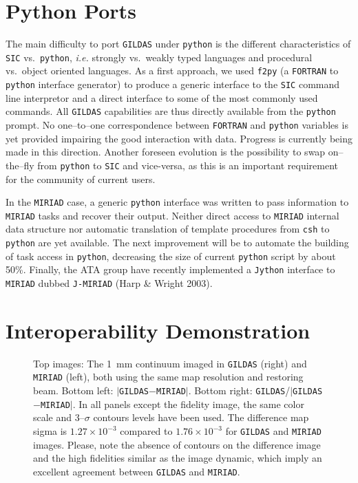 \documentclass[11pt,twoside]{article}  %
\newcommand{\FORTRAN}{\texttt{FORTRAN}}
\newcommand{\GILDAS}{\texttt{GILDAS}}
\newcommand{\MIRIAD}{\texttt{MIRIAD}}
\newcommand{\python}{\texttt{python}}
\newcommand{\fpig}{\texttt{f2py}}
\newcommand{\SIC}{\texttt{SIC}}
\newcommand{\ie} {{\em i.e.}}
\begin{document}
\vspace*{-0.5cm}

\section{Python Ports}

The main difficulty to port \GILDAS{} under \python{} is the different
characteristics of \SIC{} vs.\ \python{}, \ie{} strongly vs.\ weakly typed
languages and procedural vs.\ object oriented languages. As a first
approach, we used \fpig{} (a \FORTRAN{} to \python{} interface generator)
to produce a generic interface to the \SIC{} command line
interpretor and a direct interface to some of the most commonly used
commands. All \GILDAS{} capabilities are thus directly available from the
\python{} prompt. No one--to--one correspondence between \FORTRAN{} and
\python{} variables is yet provided impairing the good interaction with
data. Progress is currently being made in this direction. Another foreseen
evolution is the possibility to swap on--the--fly from \python{} to \SIC{}
and vice-versa, as this is an important requirement for the community of
current users.

In the \MIRIAD{} case, a generic \python{} interface was written to pass
information to \MIRIAD{} tasks and recover their output.  Neither direct
access to \MIRIAD{} internal data structure nor automatic translation of
template procedures from \texttt{csh} to \python{} are yet available. The
next improvement will be to automate the building of task access in
\python{}, decreasing the size of current \python{} script by about 50\%.
Finally, the ATA group have recently implemented a \texttt{Jython}
interface to \MIRIAD{} dubbed \texttt{J-MIRIAD} (Harp \& Wright 2003).

\vspace*{-0.5cm}

\section{Interoperability Demonstration}

\begin{figure}[t]
  \caption{Top images: The 1~mm continuum imaged in \GILDAS{} (right) and
    \MIRIAD{} (left), both using the same map resolution and restoring
    beam.  Bottom left: $|$\GILDAS{}$-$\MIRIAD{}$|$. Bottom right:
    \GILDAS{}/$|$\GILDAS{}$-$\MIRIAD{}$|$. In all panels except the
    fidelity image, the same color scale and 3--$\sigma$ contours levels
    have been used. The difference map sigma is $1.27\times10^{-3}$ compared to
    $1.76\times10^{-3}$ for \GILDAS{} and \MIRIAD{} images. Please, note the
    absence of contours on the difference image and the high fidelities
    similar as the image dynamic, which imply an excellent agreement
    between \GILDAS{} and \MIRIAD{}.}
  \label{fig:P4-14_f2}
\end{figure}
\end{document}
